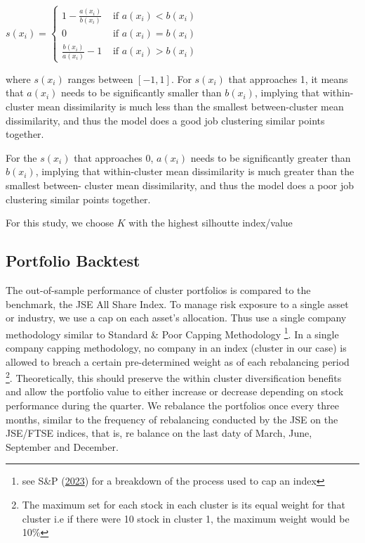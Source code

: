 \documentclass[11pt,preprint, authoryear]{elsarticle}
\numberwithin{equation}{section}
\numberwithin{figure}{section}
\numberwithin{table}{section}
\let\rmarkdownfootnote\footnote%
\def\footnote{\protect\rmarkdownfootnote}
\begin{document}
\(s\left(x_i\right)= \begin{cases}1-\frac{a\left(x_i\right)}{b\left(x_i\right)} & \text { if } a\left(x_i\right)<b\left(x_i\right) \\ 0 & \text { if } a\left(x_i\right)=b\left(x_i\right) \\ \frac{b\left(x_i\right)}{a\left(x_i\right)}-1 & \text { if } a\left(x_i\right)>b\left(x_i\right)\end{cases}\)

where \(s(x_i)\) ranges between \([-1, 1]\). For \(s(x_i)\) that
approaches 1, it means that \(a(x_i)\) needs to be significantly smaller
than \(b(x_i)\), implying that within-cluster mean dissimilarity is much
less than the smallest between-cluster mean dissimilarity, and thus the
model does a good job clustering similar points together.

For the \(s(x_i)\) that approaches 0, \(a(x_i)\) needs to be
significantly greater than \(b(x_i)\), implying that within-cluster mean
dissimilarity is much greater than the smallest between- cluster mean
dissimilarity, and thus the model does a poor job clustering similar
points together.

For this study, we choose \(K\) with the highest silhoutte index/value

\hypertarget{portfolio-backtest}{%
\subsection{Portfolio Backtest}\label{portfolio-backtest}}

The out-of-sample performance of cluster portfolios is compared to the
benchmark, the JSE All Share Index. To manage risk exposure to a single
asset or industry, we use a cap on each asset's allocation. Thus use a
single company methodology similar to Standard \& Poor Capping
Methodology \footnote{see S\&P (\protect\hyperlink{ref-sp}{2023}) for a
  breakdown of the process used to cap an index}. In a single company
capping methodology, no company in an index (cluster in our case) is
allowed to breach a certain pre-determined weight as of each rebalancing
period \footnote{The maximum set for each stock in each cluster is its
  equal weight for that cluster i.e if there were 10 stock in cluster 1,
  the maximum weight would be 10\%}. Theoretically, this should preserve
the within cluster diversification benefits and allow the portfolio
value to either increase or decrease depending on stock performance
during the quarter. We rebalance the portfolios once every three months,
similar to the frequency of rebalancing conducted by the JSE on the
JSE/FTSE indices, that is, re balance on the last daty of March, June,
September and December.
\end{document}
